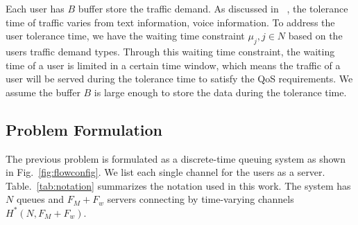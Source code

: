 Each user has $B$ buffer store the traffic demand. As discussed in ~\cite{niida2010user}, the tolerance 
time of traffic varies from text information, voice information. To address the user tolerance time, we 
have the waiting time constraint $\mu_j,j\in N$ based on the users traffic demand types.  
Through this waiting time constraint, the waiting time of a user is limited in a certain time window, 
which means the traffic of a user will be served during the tolerance time to satisfy the QoS requirements.
We assume the buffer $B$ is large enough to store the data during the tolerance time.
%




\subsection{Problem Formulation}
\label{subsec:problem}


The previous problem is formulated as a discrete-time queuing system as shown in Fig.~\ref{fig:flowconfig}.
We list each single channel for the users as a server.
Table.~\ref{tab:notation} summarizes the notation used in this work.
The system has $N$ queues and $F_M+F_w$ servers connecting by time-varying channels $H^*(N,F_M+F_w)$.



